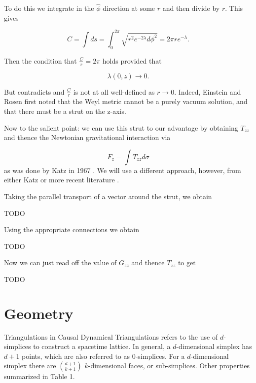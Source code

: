 \documentclass[12pt]{article}
\begin{document}
To do this we integrate in the $\hat{\phi}$ direction at
some $r$ and then divide by $r$. This gives

\begin{equation}
  \label{eq:phi-hat-length}
  C=\int ds =
  \int_0^{2\pi}\sqrt{r^2e^{-2\lambda}d\phi^2}={2\pi re^{-\lambda}}.
\end{equation}

Then the condition that $\frac{C}{r}=2\pi$ holds provided that

\begin{equation}
	\label{eq:lambda-elem-flat}
	\lambda(0,z)\rightarrow 0.
\end{equation} 

But  contradicts  and $\frac{C}{r}$ is not at all well-defined as $r\rightarrow 0$. Indeed, Einstein and Rosen \cite{einstein-rosen-1936} first noted that the Weyl metric cannot be a purely vacuum solution, and that there must be a strut on the z-axis.

Now to the salient point: we can use this strut to our advantage by obtaining $T_{zz}$ and thence the Newtonian gravitational interaction via

\begin{equation}
	\label{eq:F_z}
	F_{z}=\int T_{zz}d\sigma
\end{equation}
as was done by Katz in 1967 \cite{katz1967derivation}. We will use a different approach, however, from either Katz or more recent literature \cite{letelier_superposition_1997}.

Taking the parallel transport of a vector around the strut, we obtain

TODO

Using the appropriate connections we obtain

TODO

Now we can just read off the value of $G_{zz}$ and thence $T_{zz}$ to get

TODO

\section{Geometry}

Triangulations in Causal Dynamical Triangulations refers to the use of $d$-simplices to construct a spacetime lattice. In general, a $d$-dimensional simplex has $d+1$ points, which are also referred to as $0$-simplices. For a $d$-dimensional simplex there are $\binom{d+1}{k+1}$ $k$-dimensional faces, or sub-simplices. Other properties summarized in Table 1.
\end{document}
